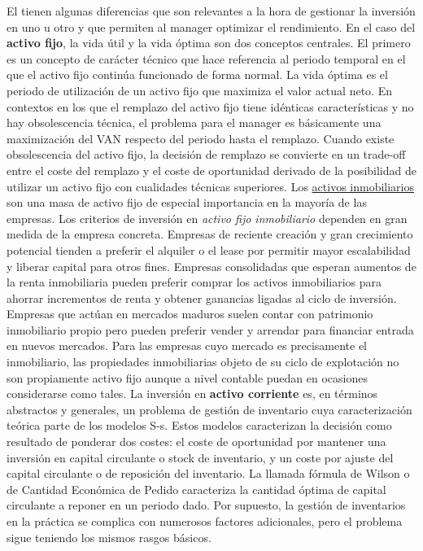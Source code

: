 \documentclass{nuevotema}
\begin{document}
El  tienen algunas diferencias que son relevantes a la hora de gestionar la inversión en uno u otro y que permiten al manager optimizar el rendimiento. En el caso del \textbf{activo fijo}, la vida útil y la vida óptima son dos conceptos centrales. El primero es un concepto de carácter técnico que hace referencia al periodo temporal en el que el activo fijo continúa funcionado de forma normal. La vida óptima es el periodo de utilización de un activo fijo que maximiza el valor actual neto. En contextos en los que el remplazo del activo fijo tiene idénticas características y no hay obsolescencia técnica, el problema para el manager es básicamente una maximización del VAN respecto del periodo hasta el remplazo. Cuando existe obsolescencia del activo fijo, la decisión de remplazo se convierte en un trade-off entre el coste del remplazo y el coste de oportunidad derivado de la posibilidad de utilizar un activo fijo con cualidades técnicas superiores. Los \underline{activos inmobiliarios} son una masa de activo fijo de especial importancia en la mayoría de las empresas. Los criterios de inversión en \textit{activo fijo inmobiliario} dependen en gran medida de la empresa concreta. Empresas de reciente creación y gran crecimiento potencial tienden a preferir el alquiler o el lease por permitir mayor escalabilidad y liberar capital para otros fines. Empresas consolidadas que esperan aumentos de la renta inmobiliaria pueden preferir comprar los activos inmobiliarios para ahorrar incrementos de renta y obtener ganancias ligadas al ciclo de inversión. Empresas que actúan en mercados maduros suelen contar con patrimonio inmobiliario propio pero pueden preferir vender y arrendar para financiar entrada en nuevos mercados. Para las empresas cuyo mercado es precisamente el inmobiliario, las propiedades inmobiliarias objeto de su ciclo de explotación no son propiamente activo fijo aunque a nivel contable puedan en ocasiones considerarse como tales. La inversión en \textbf{activo corriente} es, en términos abstractos y generales, un problema de gestión de inventario cuya caracterización teórica parte de los modelos S-s. Estos modelos caracterizan la decisión como resultado de ponderar dos costes: el coste de oportunidad por mantener una inversión en capital circulante o stock de inventario, y un coste por ajuste del capital circulante o de reposición del inventario. La llamada fórmula de Wilson o de Cantidad Económica de Pedido caracteriza la cantidad óptima de capital circulante a reponer en un periodo dado. Por supuesto, la gestión de inventarios en la práctica se complica con numerosos factores adicionales, pero el problema sigue teniendo los mismos rasgos básicos.
\end{document}
